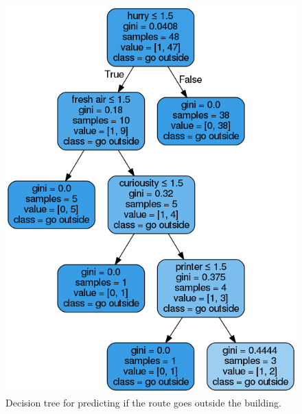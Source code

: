 \documentclass{sigchi}
\begin{document}
\begin{figure}[!h]
\centering
\includegraphics[width=0.7\columnwidth]{pics/decisionTree_8.png}
\caption{Decision tree for predicting if the route goes outside the building.}
\label{fig:dt8}
\end{figure}
\end{document}
